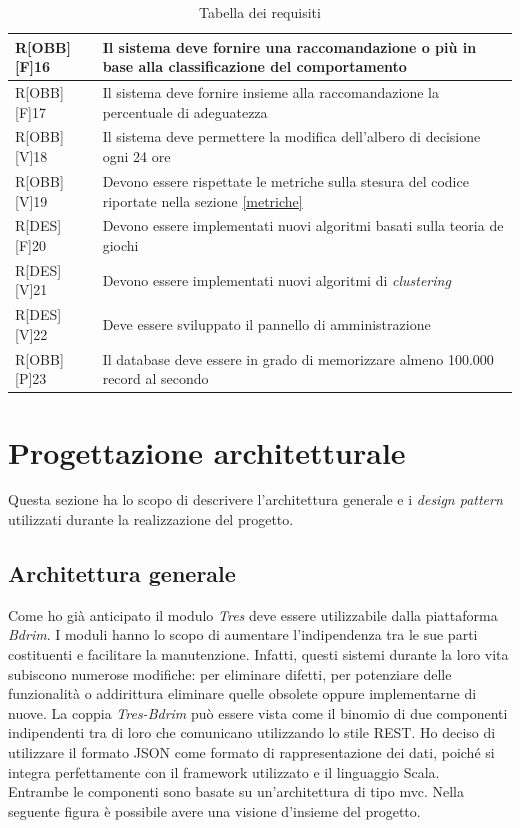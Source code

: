 \newpage
\begin{table}[h]
	\begin{tabular}{|p{}|p{}|}
		\midrule
		R[OBB][F]16 & Il sistema deve fornire una raccomandazione o più in base alla classificazione del comportamento \\ \midrule
		R[OBB][F]17 & Il sistema deve fornire insieme alla raccomandazione la percentuale di adeguatezza \\ \midrule
		R[OBB][V]18 & Il sistema deve permettere la modifica dell'albero di decisione ogni 24 ore \\ \midrule
		R[OBB][V]19 & Devono essere rispettate le metriche sulla stesura del codice riportate nella sezione \ref{metriche} \\ \midrule
		R[DES][F]20 & Devono essere implementati nuovi algoritmi basati sulla teoria de giochi \\ \midrule
		R[DES][V]21 & Devono essere implementati nuovi algoritmi di \textit{clustering} \\ \midrule
		R[DES][V]22 & Deve essere sviluppato il pannello di amministrazione \\ \midrule
		R[OBB][P]23 & Il database deve essere in grado di memorizzare almeno 100.000 record al secondo \\ 
		
		\bottomrule
		
	\end{tabular}
	\caption{Tabella dei requisiti}
\end{table}

\section{Progettazione architetturale}
Questa sezione ha lo scopo di descrivere l'architettura generale e i \textit{design pattern} utilizzati durante la realizzazione del progetto.
\subsection{Architettura generale}
Come ho già anticipato il modulo \textit{Tres} deve essere utilizzabile dalla piattaforma \textit{Bdrim}.  I moduli hanno lo scopo di aumentare l'indipendenza tra le sue parti costituenti e facilitare la manutenzione. Infatti, questi sistemi durante la loro vita subiscono numerose modifiche: per eliminare difetti, per potenziare delle funzionalità o addirittura eliminare quelle obsolete oppure implementarne di nuove. La coppia \textit{Tres-Bdrim} può essere vista come il binomio di due componenti indipendenti tra di loro che comunicano utilizzando lo stile \gls{REST}. Ho deciso di utilizzare il formato \gls{JSON} come formato di rappresentazione dei dati, poiché si integra perfettamente con il \gls{framework} utilizzato e il linguaggio Scala.\\
Entrambe le componenti sono basate su un'architettura di tipo \gls{mvc}. Nella seguente figura è possibile avere una visione d'insieme del progetto.

